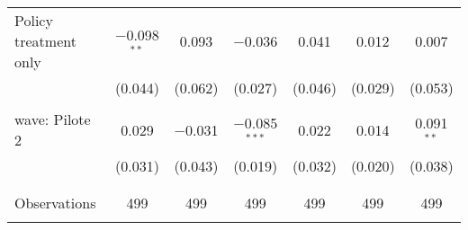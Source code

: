 \begin{tabular}{@{\extracolsep{5pt}}lcccccc}
 Policy treatment only & $-$0.098$^{**}$ & 0.093 & $-$0.036 & 0.041 & 0.012 & 0.007 \\ 
  & (0.044) & (0.062) & (0.027) & (0.046) & (0.029) & (0.053) \\ 
  & & & & & & \\ 
 wave: Pilote 2 & 0.029 & $-$0.031 & $-$0.085$^{***}$ & 0.022 & 0.014 & 0.091$^{**}$ \\ 
  & (0.031) & (0.043) & (0.019) & (0.032) & (0.020) & (0.038) \\ 
  & & & & & & \\ 
\hline \\[-1.8ex] 

Observations & 499 & 499 & 499 & 499 & 499 & 499 \\ 
\hline 
\hline \\[-1.8ex] 
\end{tabular} 